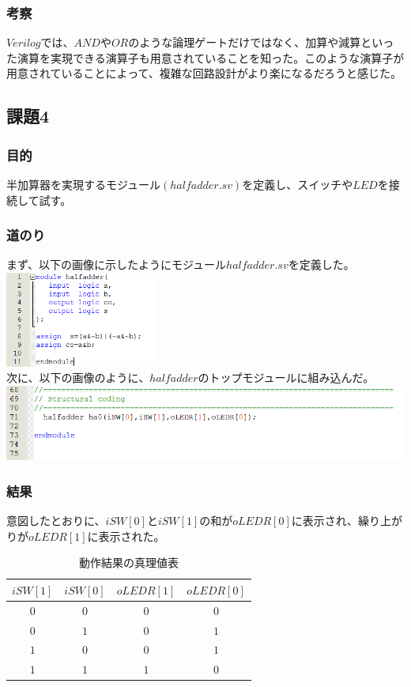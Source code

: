 \documentclass[a4paper]{jarticle}
\begin{document}
\subsubsection{考察}
$Verilog$では、$AND$や$OR$のような論理ゲートだけではなく、加算や減算といった演算を実現できる演算子も用意されていることを知った。このような演算子が用意されていることによって、複雑な回路設計がより楽になるだろうと感じた。
\subsection{課題4}
\subsubsection{目的}
半加算器を実現するモジュール$\left( halfadder.sv \right)$を定義し、スイッチや$LED$を接続して試す。
\subsubsection{道のり}
まず、以下の画像に示したようにモジュール$halfadder.sv$を定義した。\\
\includegraphics[width=5cm]{work4/4-2.PNG}\\
次に、以下の画像のように、$halfadder$のトップモジュールに組み込んだ。\\
\includegraphics[width=15cm]{work4/4-1.PNG}
\subsubsection{結果}
意図したとおりに、$iSW[0]$と$iSW[1]$の和が$oLEDR[0]$に表示され、繰り上がりが$oLEDR[1]$に表示された。
\begin{table}[H]
	\begin{center}
		\caption{動作結果の真理値表}
		\label{Work4TruthTable}
		\begin{tabular}{|c|c||c|c|}
			\hline
			$iSW[1]$	&$iSW[0]$	&$oLEDR[1]$	&$oLEDR[0]$\\	\hline\hline
			$0$		&$0$		&$0$		&$0$\\		\hline
			$0$		&$1$		&$0$		&$1$\\		\hline
			$1$		&$0$		&$0$		&$1$\\		\hline
			$1$		&$1$		&$1$		&$0$\\		\hline
		\end{tabular}
	\end{center}
\end{table}
\end{document}

